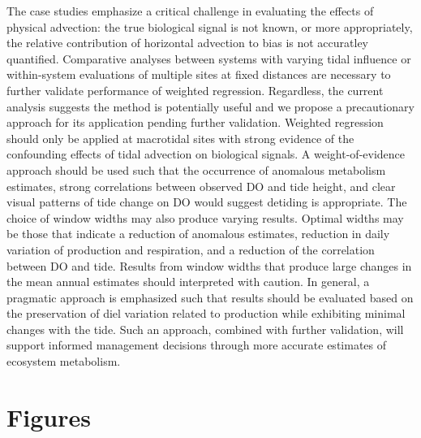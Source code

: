 \documentclass[letterpaper,12pt,oneside]{article}\usepackage[]{graphicx}\usepackage[]{color}
\begin{document}
The case studies emphasize a critical challenge in evaluating the effects of physical advection: the true biological signal is not known, or more appropriately, the relative contribution of horizontal advection to bias is not accuratley quantified.  Comparative analyses between systems with varying tidal influence or within-system evaluations of multiple sites at fixed distances are necessary to further validate performance of weighted regression.  Regardless, the current analysis suggests the method is potentially useful and we propose a precautionary approach for its application pending further validation.  Weighted regression should only be applied at macrotidal sites with strong evidence of the confounding effects of tidal advection on biological signals.  A weight-of-evidence approach should be used such that the occurrence of anomalous metabolism estimates, strong correlations between observed \ac{DO} and tide height, and clear visual patterns of tide change on \ac{DO} would suggest detiding is appropriate.  The choice of window widths may also produce varying results.  Optimal widths may be those that indicate a reduction of anomalous estimates, reduction in daily variation of production and respiration, and a reduction of the correlation between \ac{DO} and tide.  Results from window widths that produce large changes in the mean annual estimates should interpreted with caution.  In general, a pragmatic approach is emphasized such that results should be evaluated based on the preservation of diel variation related to production while exhibiting minimal changes with the tide.  Such an approach, combined with further validation, will support informed management decisions through more accurate estimates of ecosystem metabolism.  

\begin{singlespace}


\end{singlespace}
\clearpage


\section{Figures}
\end{document}
